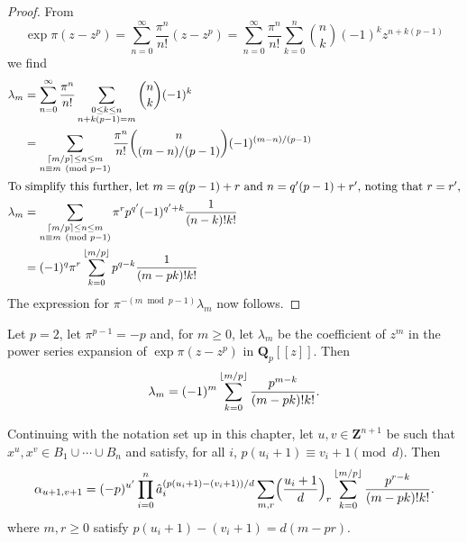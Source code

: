 \begin{proof}
From
\begin{equation*}
\exp \pi (z - z^p) = \sum_{n=0}^{\infty} \frac{\pi^n}{n!} (z - z^p) 
                   = \sum_{n=0}^{\infty} \frac{\pi^n}{n!} \sum_{k=0}^n \binom{n}{k} (-1)^k z^{n + k(p-1)}
\end{equation*}
we find 
\begin{align*}
\lambda_m & = \sum_{n = 0}^{\infty} \frac{\pi^n}{n!} \sum_{\substack{0 \leq k \leq n\\n + k(p-1) = m}} \binom{n}{k} (-1)^k \\
          & = \sum_{\substack{\left\lceil m/p\right\rceil \leq n \leq m\\ n \equiv m \pmod{p-1}}} \frac{\pi^n}{n!} \binom{n}{(m-n)/(p-1)} (-1)^{(m-n)/(p-1)} \\
\intertext{To simplify this further, let $m = q(p-1) + r$ and $n = q'(p-1) + r'$, noting that $r = r'$,}
\lambda_m & = \sum_{\substack{\left\lceil m/p\right\rceil \leq n \leq m\\ n \equiv m \pmod{p-1}}} \pi^r p^{q'} (-1)^{q' + k} \frac{1}{(n-k)! k!} \\
          & = (-1)^q \pi^r \sum_{k=0}^{\left\lfloor m/p\right\rfloor} p^{q - k} \frac{1}{(m - pk)!k!}
\end{align*}
The expression for $\pi^{-(m \bmod{p-1})} \lambda_m$ now follows.
\end{proof}

\begin{cor} \label{cor:lambda2}
Let $p = 2$, let $\pi^{p-1} = -p$ and, for $m \geq 0$, let $\lambda_m$ 
be the coefficient of $z^m$ in the power series expansion of 
$\exp \pi (z - z^p)$ in $\mathbf{Q}_p[[z]]$.  Then 
\begin{equation*}
\lambda_m = (-1)^m \sum_{k=0}^{\left\lfloor m/p\right\rfloor} \frac{p^{m - k}}{(m - pk)! k!}.
\end{equation*}
\end{cor}

\begin{thm} \label{thm:alpha}
Continuing with the notation set up in this chapter, let 
$u, v \in \mathbf{Z}^{n+1}$ be such that 
$x^u, x^v \in B_1 \cup \dotsb \cup B_n$ and satisfy, 
for all $i$, $p (u_i + 1) \equiv v_i + 1 \pmod{d}$. 
Then 
\begin{equation*}
\alpha_{u+1,v+1} = (-p)^{u'} \prod_{i=0}^n 
    \hat{a}_i^{(p (u_i + 1) - (v_i + 1))/d} \sum_{m,r} 
    \Bigl(\frac{u_i+1}{d}\Bigr)_r 
    \sum_{k=0}^{\left\lfloor m/p\right\rfloor} \frac{p^{r-k}}{(m-pk)! k!}.
\end{equation*}
where $m, r \geq 0$ satisfy $p (u_i + 1) - (v_i + 1) = d (m - pr)$. 
\end{thm}

